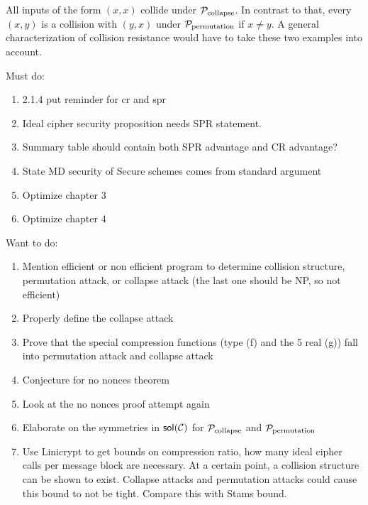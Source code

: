 All inputs of the form $(x,x)$ collide under $\P_{\mathrm{collapse}}$.
In contrast to that, every $(x,y)$ is a collision with $(y,x)$ under $\P_{\mathrm{permutation}}$ if $x \neq y$.
A general characterization of collision resistance would have to take these two examples into account.

\pagebreak

Must do:
\begin{enumerate}
\item 2.1.4 put reminder for cr and spr
\item Ideal cipher security proposition needs SPR statement.
\item Summary table should contain both SPR advantage and CR advantage?
\item State MD security of Secure schemes comes from standard argument
\item Optimize chapter 3
\item Optimize chapter 4
\end{enumerate}

Want to do:
\begin{enumerate}
\item Mention efficient or non efficient program to determine collision structure, permutation attack, or collapse attack (the last one should be NP, so not efficient) 
\item Properly define the collapse attack
\item Prove that the special compression functions (type (f) and the 5 real (g)) fall into permutation attack and collapse attack
\item Conjecture for no nonces theorem
\item Look at the no nonces proof attempt again
\item Elaborate on the symmetries in $\sol(\C)$ for $\P_\mathrm{collapse}$ and $\P_\mathrm{permutation}$
\item Use Linicrypt to get bounds on compression ratio, how many ideal cipher calls per message block are necessary.
At a certain point, a collision structure can be shown to exist.
Collapse attacks and permutation attacks could cause this bound to not be tight.
Compare this with Stams bound.
\end{enumerate}
